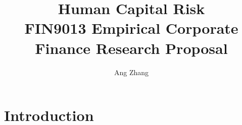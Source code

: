 \documentclass[a4paper, 10pt, authoryear]{elsarticle}
\begin{document}
\title{
    Human Capital Risk \\
    \large FIN9013 Empirical Corporate Finance Research Proposal
}
\author{Ang Zhang}


\maketitle

\section{Introduction}
\end{document}
